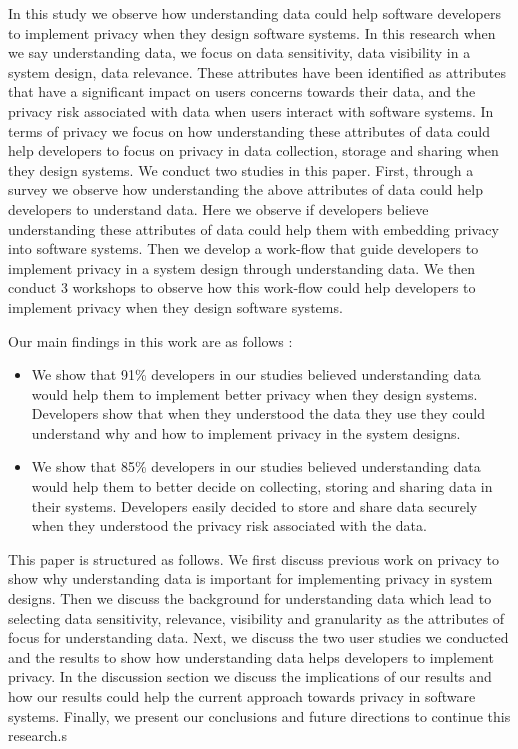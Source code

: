 \documentclass{sigchi}
\begin{document}
In this study we observe how understanding data could help software developers to implement privacy when they design software systems. In this research when we say understanding data, we focus on data sensitivity, data visibility in a system design, data relevance. These attributes have been identified as attributes that have a significant impact on users concerns towards their data, and the privacy risk associated with data when users interact with software systems. In terms of privacy we focus on how understanding these attributes of data could help developers to focus on privacy in data collection, storage and sharing when they design systems. We conduct two studies in this paper. First, through a survey we observe how understanding the above attributes of data could help developers to understand data. Here we observe if developers believe understanding these attributes of data could help them with embedding privacy into software systems. Then we develop a work-flow that guide developers to implement privacy in a system design through understanding data. We then conduct 3 workshops to observe how this work-flow could help developers to implement privacy when they design software systems.

Our main findings in this work are as follows :

\begin{itemize}
\item We show that 91\% developers in our studies believed understanding data would help them to implement better privacy when they design systems. Developers show that when they understood the data they use they could understand why and how to implement privacy in the system designs.
\item We show that 85\% developers in our studies believed understanding data would help them to better decide on collecting, storing and sharing data in their systems. Developers easily decided to store and share data securely when they understood the privacy risk associated with the data.
\end {itemize}

This paper is structured as follows. We first discuss previous work on privacy to show why understanding data is important for implementing privacy in system designs. Then we discuss the background for understanding data which lead to selecting data sensitivity, relevance, visibility and granularity as the attributes of focus for understanding data. Next, we discuss the two user studies we conducted and the results to show how understanding data helps developers to implement privacy. In the discussion section we discuss the implications of our results and how our results could help the current approach towards privacy in software systems. Finally, we present our conclusions and future directions to continue this research.s
\end{document}
